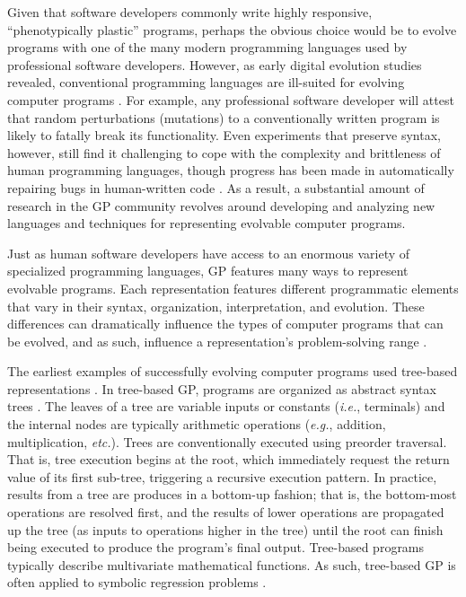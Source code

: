 Given that software developers commonly write highly responsive, ``phenotypically plastic'' programs, perhaps the obvious choice would be to evolve programs with one of the many modern programming languages used by professional software developers.
However, as early digital evolution studies revealed, conventional programming languages are ill-suited for evolving computer programs \citep{rasmussen_core_1989}.
For example, any professional software developer will attest that random perturbations (mutations) to a conventionally written program is likely to fatally break its functionality. 
Even experiments that preserve syntax, however, still find it challenging to cope with the complexity and brittleness of human programming languages, though progress has been made in automatically repairing bugs in human-written code \citep{le_goues_genprog_2012,le_goues_systematic_2012,yuan_arja_2020}.
As a result, a substantial amount of research in the GP community revolves around developing and analyzing new languages and techniques for representing evolvable computer programs.

Just as human software developers have access to an enormous variety of specialized programming languages, GP features many ways to represent evolvable programs.
Each representation features different programmatic elements that vary in their syntax, organization, interpretation, and evolution.
These differences can dramatically influence the types of computer programs that can be evolved, and as such, influence a representation's problem-solving range \citep{hintze_buffet_2019,wilson_comparison_2008}. 


The earliest examples of successfully evolving computer programs used tree-based representations \citep{forsyth_beagle_1981,koza_hierarchical_1989}.
In tree-based GP, programs are organized as abstract syntax trees \citep{poli_field_2008}.
The leaves of a tree are variable inputs or constants (\textit{i.e.}, terminals) and the internal nodes are typically arithmetic operations (\textit{e.g.}, addition, multiplication, \textit{etc.}).
Trees are conventionally executed using preorder traversal.
That is, tree execution begins at the root, which immediately request the return value of its first sub-tree, triggering a recursive execution pattern.
In practice, results from a tree are produces in a bottom-up fashion; that is, the bottom-most operations are resolved first, and the results of lower operations are propagated up the tree (as inputs to operations higher in the tree) until the root can finish being executed to produce the program's final output.
Tree-based programs typically describe multivariate mathematical functions.
As such, tree-based GP is often applied to symbolic regression problems \citep{orzechowski_where_2018}. %

